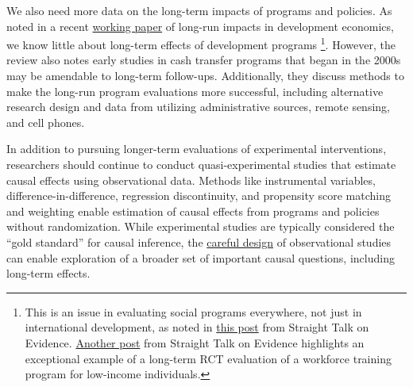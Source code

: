 \documentclass[11pt]{article}
\begin{document}

We also need more data on the long-term impacts of programs and policies. As noted in a recent \href{https://www.nber.org/papers/w25356}{working paper} of long-run impacts in development economics, we know little about long-term effects of development programs \footnote{This is an issue in evaluating social programs everywhere, not just in international development, as noted in  \href{texthttps://www.straighttalkonevidence.org/2019/04/03/beware-the-pitfalls-of-short-term-program-effects-they-often-fade/}{this post} from Straight Talk on Evidence.  \href{https://www.straighttalkonevidence.org/2019/04/30/not-all-program-effects-fade-new-report-on-the-project-quest-rct-shows-sizable-nine-year-earnings-gains-for-low-income-workers/}{Another post} from Straight Talk on Evidence highlights an exceptional example of a long-term RCT evaluation of a workforce training program for low-income individuals.}. However, the review also notes early studies in cash transfer programs that began in the 2000s may be amendable to long-term follow-ups. Additionally, they discuss methods to make the long-run program evaluations more successful, including alternative research design and data from utilizing administrative sources, remote sensing, and cell phones.


In addition to pursuing longer-term evaluations of experimental interventions, researchers should continue to conduct quasi-experimental studies that estimate causal effects using observational data. Methods like instrumental variables, difference-in-difference, regression discontinuity, and propensity score matching and weighting enable estimation of causal effects from programs and policies without randomization. While experimental studies are typically considered the ``gold standard'' for causal inference, the \href{https://onlinelibrary.wiley.com/doi/abs/10.1002/sim.2739}{careful design} of observational studies can enable exploration of a broader set of important causal questions, including long-term effects.
\end{document}
